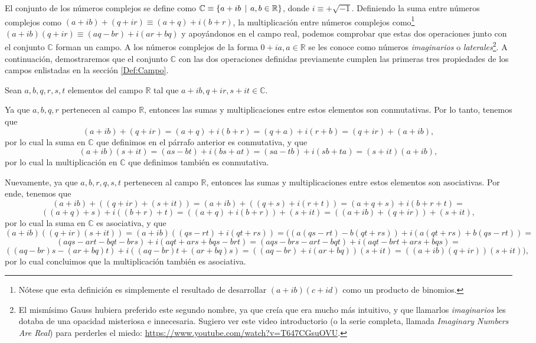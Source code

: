 \documentclass[apuntes]{subfiles}
\begin{document}
El conjunto de los números complejos se define como $\mathbb{C} \equiv \{a+ib\hspace{1.5mm}|\hspace{1.5mm}a,b\in\mathbb{R}\}$, donde $i\equiv+\sqrt{-1}$. Definiendo la suma entre números complejos como $(a+ib)+(q+ir)\equiv(a+q) + i(b+r)$, la multiplicación entre números complejos como\footnote{Nótese que esta definición es simplemente el resultado de desarrollar $(a+ib)(c+id)$ como un producto de binomios.} $(a+ib)(q+ir)\equiv (aq-br) + i(ar+bq)$ y apoyándonos en el campo real, podemos comprobar que estas dos operaciones junto con el conjunto $\mathbb{C}$ forman un campo. A los números complejos de la forma $0+ia, a\in\mathbb{R}$ se les conoce como números \emph{imaginarios} o \emph{laterales}\footnote{El mismísimo Gauss hubiera preferido este segundo nombre, ya que creía que era mucho más intuitivo, y que llamarlos \emph{imaginarios} les dotaba de una opacidad misteriosa e innecesaria. Sugiero ver este video introductorio (o la serie completa, llamada \emph{Imaginary Numbers Are Real}) para perderles el miedo: \url{https://www.youtube.com/watch?v=T647CGsuOVU}.}. A continuación, demostraremos que el conjunto $\mathbb{C}$ con las dos operaciones definidas previamente cumplen las primeras tres propiedades de los campos enlistadas en la sección \ref{Def:Campo}.

Sean $a,b,q,r,s,t$ elementos del campo $\mathbb{R}$ tal que $a+ib, q+ir, s+it\in\mathbb{C}.$

Ya que $a,b,q,r$ pertenecen al campo $\mathbb{R}$, entonces las sumas y multiplicaciones entre estos elementos son conmutativas. Por lo tanto, tenemos que $$(a+ib)+(q+ir)=(a+q)+i(b+r)=(q+a)+i(r+b)=(q+ir)+(a+ib),$$\noindent por lo cual la suma en $\mathbb{C}$ que definimos en el párrafo anterior es conmutativa, y que $$(a+ib)(s+it)=(as-bt)+i(bs+at)=(sa-tb)+i(sb+ta)=(s+it)(a+ib),$$\noindent por lo cual la multiplicación en $\mathbb{C}$ que definimos también es conmutativa.

Nuevamente, ya que $a,b,r,q,s,t$ pertenecen al campo $\mathbb{R}$, entonces las sumas y multiplicaciones entre estos elementos son asociativas. Por ende, tenemos que $$(a+ib)+((q+ir)+(s+it))=(a+ib)+((q+s)+i(r+t))=(a+q+s)+i(b+r+t)=$$ $$((a+q)+s)+i((b+r)+t)=((a+q)+i(b+r))+(s+it)=((a+ib)+(q+ir))+(s+it),$$ por lo cual la suma en $\mathbb{C}$ es asociativa, y que $$(a+ib)((q+ir)(s+it))=(a+ib)((qs-rt)+i(qt+rs))=((a(qs-rt)-b(qt+rs))+i(a(qt+rs)+b(qs-rt))=$$ $$(aqs-art-bqt-brs)+i(aqt+ars+bqs-brt)=(aqs-brs-art-bqt)+i(aqt-brt+ars+bqs)=$$ $$((aq-br)s-(ar+bq)t)+i((aq-br)t+(ar+bq)s)=((aq-br)+i(ar+bq))(s+it)=((a+ib)(q+ir))(s+it)),$$\noindent por lo cual concluimos que la multiplicación también es asociativa.
\end{document}
